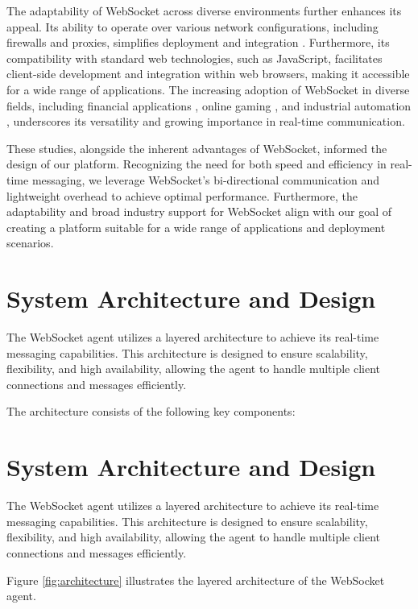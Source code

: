 \documentclass[a4paper, 11pt]{article}
\begin{document}
The adaptability of WebSocket across diverse environments further enhances its appeal. Its ability to operate over various network configurations, including firewalls and proxies, simplifies deployment and integration \cite{melnikov2011}. Furthermore, its compatibility with standard web technologies, such as JavaScript, facilitates client-side development and integration within web browsers, making it accessible for a wide range of applications. The increasing adoption of WebSocket in diverse fields, including financial applications \cite{chika2019}, online gaming \cite{armstrong2015}, and industrial automation \cite{mestav2018}, underscores its versatility and growing importance in real-time communication.

These studies, alongside the inherent advantages of WebSocket, informed the design of our platform. Recognizing the need for both speed and efficiency in real-time messaging, we leverage WebSocket's bi-directional communication and lightweight overhead to achieve optimal performance. Furthermore, the adaptability and broad industry support for WebSocket align with our goal of creating a platform suitable for a wide range of applications and deployment scenarios.

\section{System Architecture and Design}

The WebSocket agent utilizes a layered architecture to achieve its real-time messaging capabilities. This architecture is designed to ensure scalability, flexibility, and high availability, allowing the agent to handle multiple client connections and messages efficiently.

The architecture consists of the following key components:

\section{System Architecture and Design}

The WebSocket agent utilizes a layered architecture to achieve its real-time messaging capabilities. This architecture is designed to ensure scalability, flexibility, and high availability, allowing the agent to handle multiple client connections and messages efficiently.

Figure \ref{fig:architecture} illustrates the layered architecture of the WebSocket agent.
\end{document}

